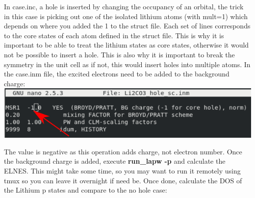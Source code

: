 \documentclass[12pt]{article}
\begin{document}
In case.inc, a hole is inserted by changing the occupancy of an orbital, the trick in this case is picking out one of the isolated lithium atoms (with mult=1) which depends on where you added the 1 to the struct file.  Each set of lines corresponds to the core states of each atom defined in the struct file.  This is why it is important to be able to treat the lithium states as core states, otherwise it would not be possible to insert a hole.  This is also why it is important to break the symmetry in the unit cell as if not, this would insert holes into multiple atoms. In the case.inm file, the excited electrons need to be added to the background charge: \\

\includegraphics[scale=0.5]{./images/hole_inm.png}

The value is negative as this operation adds charge, not electron number.  Once the background charge is added, execute \textbf{run\_lapw -p} and calculate the ELNES. This might take some time, so you may want to run it remotely using tmux so you can leave it overnight if need be.  Once done, calculate the DOS of the Lithium p states and compare to the no hole case: 
\end{document}
